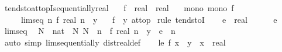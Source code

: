 \begin{isabellebody}
\isamarkupfalse%
%
\endisatagproof
{\isafoldproof}%
%
\isadelimproof
\isanewline
%
\endisadelimproof
\isanewline
{}\isamarkupfalse%
\ tendsto{\isacharunderscore}{\kern0pt}at{\isacharunderscore}{\kern0pt}topI{\isacharunderscore}{\kern0pt}sequentially{\isacharunderscore}{\kern0pt}real{\isacharcolon}{\kern0pt}\isanewline
\ \ \ f\ {\isacharcolon}{\kern0pt}{\isacharcolon}{\kern0pt}\ {\isachardoublequoteopen}real\ {\isasymRightarrow}\ real{\isachardoublequoteclose}\isanewline
\ \ \ mono{\isacharcolon}{\kern0pt}\ {\isachardoublequoteopen}mono\ f{\isachardoublequoteclose}\isanewline
\ \ \ \ \ limseq{\isacharcolon}{\kern0pt}\ {\isachardoublequoteopen}{\isacharparenleft}{\kern0pt}{\isasymlambda}n{\isachardot}{\kern0pt}\ f\ {\isacharparenleft}{\kern0pt}real\ n{\isacharparenright}{\kern0pt}{\isacharparenright}{\kern0pt}\ {\isasymlonglonglongrightarrow}\ y{\isachardoublequoteclose}\isanewline
\ \ \ {\isachardoublequoteopen}{\isacharparenleft}{\kern0pt}f\ {\isasymlonglongrightarrow}\ y{\isacharparenright}{\kern0pt}\ at{\isacharunderscore}{\kern0pt}top{\isachardoublequoteclose}\isanewline
%
\isadelimproof
%
\endisadelimproof
%
\isatagproof
{}\isamarkupfalse%
\ {\isacharparenleft}{\kern0pt}rule\ tendstoI{\isacharparenright}{\kern0pt}\isanewline
\ \ \isamarkupfalse%
\ e\ {\isacharcolon}{\kern0pt}{\isacharcolon}{\kern0pt}\ real\isanewline
\ \ \isamarkupfalse%
\ {\isachardoublequoteopen}{}\ {\isacharless}{\kern0pt}\ e{\isachardoublequoteclose}\isanewline
\ \ \isamarkupfalse%
\ limseq\ \isamarkupfalse%
\ N\ {\isacharcolon}{\kern0pt}{\isacharcolon}{\kern0pt}\ nat\ \ N{\isacharcolon}{\kern0pt}\ {\isachardoublequoteopen}N\ {\isasymle}\ n\ {\isasymLongrightarrow}\ {\isasymbar}f\ {\isacharparenleft}{\kern0pt}real\ n{\isacharparenright}{\kern0pt}\ {\isacharminus}{\kern0pt}\ y{\isasymbar}\ {\isacharless}{\kern0pt}\ e{\isachardoublequoteclose}\ \ n\isanewline
\ \ \ \ \isamarkupfalse%
\ {\isacharparenleft}{\kern0pt}auto\ simp{\isacharcolon}{\kern0pt}\ lim{\isacharunderscore}{\kern0pt}sequentially\ dist{\isacharunderscore}{\kern0pt}real{\isacharunderscore}{\kern0pt}def{\isacharparenright}{\kern0pt}\isanewline
\ \ \isamarkupfalse%
\ le{\isacharcolon}{\kern0pt}\ {\isachardoublequoteopen}f\ x\ {\isasymle}\ y{\isachardoublequoteclose}\ \ x\ {\isacharcolon}{\kern0pt}{\isacharcolon}{\kern0pt}\ real\isanewline

\end{isabellebody}

